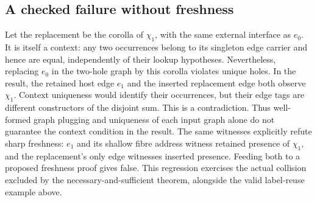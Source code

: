 \subsection{A checked failure without freshness}
Let the replacement be the corolla of $\chi_1$, with the same external interface
as $e_0$. It is itself a context: any two occurrences belong to its singleton
edge carrier and hence are equal, independently of their lookup hypotheses.
Nevertheless, replacing $e_0$ in the two-hole graph by this corolla violates
unique holes. In the result, the retained host edge $e_1$ and the inserted
replacement edge both observe $\chi_1$. Context uniqueness would identify their
occurrences, but their edge tags are different constructors of the disjoint sum.
This is a contradiction. Thus well-formed graph plugging and uniqueness of each
input graph alone do not guarantee the context condition in the result.
The same witnesses explicitly refute sharp freshness: $e_1$ and its shallow fibre
address witness retained presence of $\chi_1$, and the replacement's only edge
witnesses inserted presence. Feeding both to a proposed freshness proof gives
false. This regression exercises the actual collision excluded by the
necessary-and-sufficient theorem, alongside the valid label-reuse example above.
